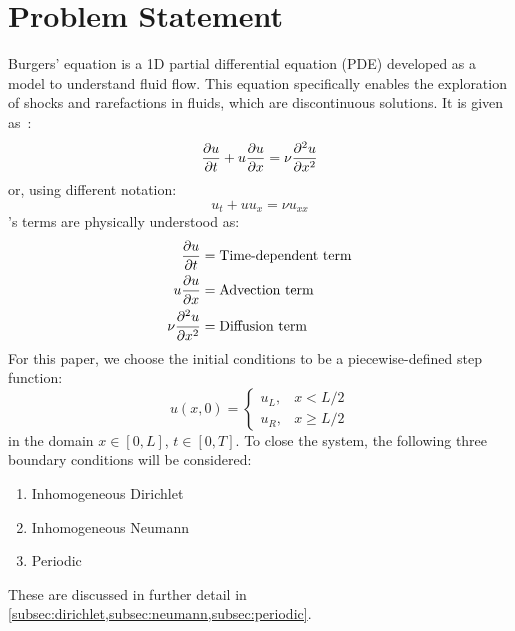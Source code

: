\documentclass[ltr]{ornltm-app-mod} %
\numberwithin{equation}{section}
\begin{document}
    \section{Problem Statement} \label{sec:problem-statement}
    Burgers' equation is a 1D partial differential equation (PDE) developed as a model to understand fluid flow.
    This equation specifically enables the exploration of shocks and rarefactions in fluids, which are discontinuous solutions.
    It is given as~\autocite{salihBurgersEquation2016}:
    \begin{equation}
        \label{eq:burgers-equation}
        \pdv{u}{t} + u\pdv{u}{x} = \nu \pdv[2]{u}{x}
    \end{equation}
    or, using different notation:
    \begin{equation}
        \label{eq:alternate-burgers-equation}
        u_t + uu_x=\nu u_{xx}
    \end{equation}
    's terms are physically understood as:
    \begin{equation*}
        \begin{split}
            \pdv{u}{t}&=\text{Time-dependent term}\\
            u\pdv{u}{x}&=\text{Advection term}\\
            \nu \pdv[2]{u}{x}&=\text{Diffusion term}
        \end{split}
    \end{equation*}
    For this paper, we choose the initial conditions to be a piecewise-defined step function:
    \begin{equation}
        \label{eq:initial-condition}
        u(x,0)=\begin{cases}
                   u_L, & x<L/2\\
                   u_R, & x\geq L/2
        \end{cases}
    \end{equation}
    in the domain $x\in [0,L]$, $t\in[0,T]$.
    To close the system, the following three boundary conditions will be considered:
    \begin{enumerate}
        \item Inhomogeneous Dirichlet
        \item Inhomogeneous Neumann
        \item Periodic
    \end{enumerate}
    These are discussed in further detail in \cref{subsec:dirichlet,subsec:neumann,subsec:periodic}.
\end{document}
